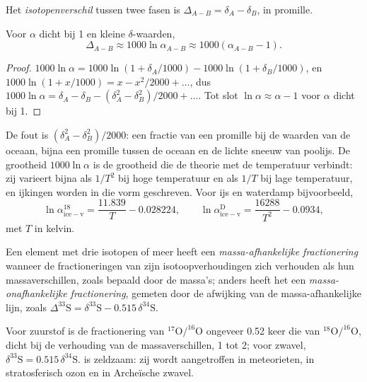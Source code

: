 \begin{definition}[Isotopenverschil]\label{def:b3:stable-isotopes:big-delta}
Het \emph{isotopenverschil}
tussen twee fasen is $\Delta_{A-B} = \delta_A - \delta_B$, in promille.
\end{definition}

\begin{proposition}
\label{prop:b3:stable-isotopes:big-delta}
Voor $\alpha$ dicht bij 1 en kleine $\delta$-waarden,
\[
\Delta_{A-B} \approx 1000\ln\alpha_{A-B} \approx 1000(\alpha_{A-B} - 1).
\]
\end{proposition}

\begin{proof}
$1000\ln\alpha = 1000\ln(1 + \delta_A/1000) - 1000\ln(1 + \delta_B/1000)$, en
$1000\ln(1 + x/1000) = x - x^2/2000 + \dots$, dus $1000\ln\alpha = \delta_A -
\delta_B - (\delta_A^2 - \delta_B^2)/2000 + \dots$. Tot slot $\ln\alpha \approx
\alpha - 1$ voor $\alpha$ dicht bij 1.
\end{proof}

De fout is $(\delta_A^2 - \delta_B^2)/2000$: een fractie van een promille bij de
waarden van de oceaan, bijna een promille tussen de oceaan en de lichte sneeuw van
poolijs.
De grootheid $1000\ln\alpha$ is de grootheid die de theorie met de temperatuur verbindt: zij
varieert bijna als $1/T^2$ bij hoge temperatuur en als $1/T$ bij lage temperatuur,
en ijkingen worden in die vorm geschreven. Voor ijs en waterdamp bijvoorbeeld,
\[
\ln\alpha^{18}_{\mathrm{ice-v}} = \frac{11.839}{T} - 0.028224, \qquad
\ln\alpha^{\mathrm D}_{\mathrm{ice-v}} = \frac{16288}{T^2} - 0.0934,
\]
met $T$ in kelvin.

\begin{definition}\label{def:b3:stable-isotopes:mif}
Een element met drie isotopen of meer heeft een \emph{massa-afhankelijke
fractionering} wanneer de fractioneringen van
zijn isotoopverhoudingen zich verhouden als hun massaverschillen, zoals bepaald door de
massa's; anders heeft het een \emph{massa-onafhankelijke
fractionering}, gemeten door de afwijking
van de massa-afhankelijke lijn, zoals $\Delta^{33}\mathrm S = \delta^{33}\mathrm S
- 0.515\,\delta^{34}\mathrm S$.
\end{definition}

Voor zuurstof is de fractionering van $^{17}\mathrm O/^{16}\mathrm O$ ongeveer 0.52 keer die
van $^{18}\mathrm O/^{16}\mathrm O$, dicht bij de verhouding van de massaverschillen, 1 tot 2;
voor zwavel, $\delta^{33}\mathrm S = 0.515\,\delta^{34}\mathrm S$.  is zeldzaam: zij wordt aangetroffen in meteorieten, in stratosferisch ozon en
in Archeïsche zwavel.

